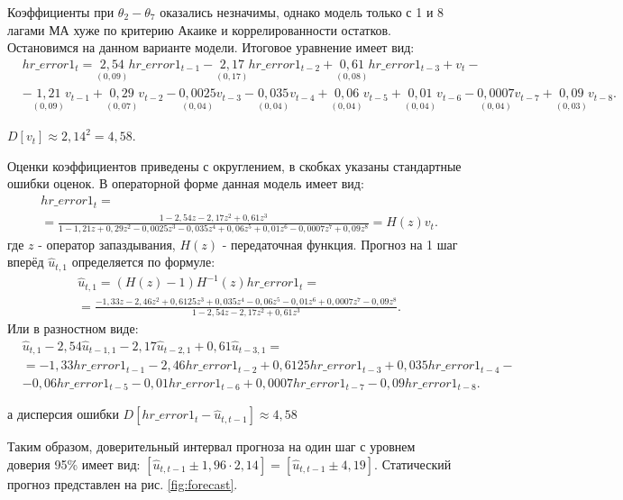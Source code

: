 \documentclass[a4paper,12pt]{article}
\begin{document}
Коэффициенты при $\theta_2-\theta_7$ оказались незначимы, однако модель только с 1 и 8 лагами МА хуже по критерию Акаике и коррелированности остатков. Остановимся на данном варианте модели. Итоговое уравнение имеет вид:
\begin{align*}
&hr\_error1_t =  \underset{(0,09)}{2,54}hr\_error1_{t-1}-\underset{(0,17)}{2,17}hr\_error1_{t-2}+\underset{(0,08)}{0,61}hr\_error1_{t-3}+v_t - \\ &-\underset{(0,09)}{1,21}v_{t-1}+\underset{(0,07)}{0,29}v_{t-2}-\underset{(0,04)}{0,0025}v_{t-3} -\underset{(0,04)}{0,035}v_{t-4}+\underset{(0,04)}{0,06}v_{t-5}+\underset{(0,04)}{0,01}v_{t-6}-\underset{(0,04)}{0,0007}v_{t-7}+\underset{(0,03)}{0,09}v_{t-8}.
\end{align*}

$D[v_t]\approx2,14^2=4,58$.

Оценки коэффициентов приведены с округлением, в скобках указаны стандартные ошибки оценок. В операторной форме данная модель имеет вид:
\begin{align*}
&hr\_error1_t = \\ & = \frac{1-2,54z-2,17z^2+0,61z^3}{1-1,21z+0,29z^2-0,0025z^3-0,035z^4+0,06z^5+0,01z^6-0,0007z^7+0,09z^8}=H(z)v_t.
\end{align*}
где $z$ - оператор запаздывания, $H(z)$ - передаточная функция. Прогноз на 1 шаг вперёд $\hat{u}_{t,1}$ определяется по формуле:
\begin{align*}
&\hat{u}_{t,1}=(H(z)-1)H^{-1}(z)hr\_error1_t= \\
& = \frac{-1,33 z - 2,46 z^2 + 0,6125 z^3 + 0,035 z^4 - 0,06 z^5 - 0,01 z^6 + 0,0007 z^7 - 0,09 z^8}{1-2,54z-2,17z^2+0,61z^3}.
\end{align*}
Или в разностном виде:
\begin{align*}
&\hat{u}_{t,1}-2,54\hat{u}_{t-1,1}-2,17\hat{u}_{t-2,1}+0,61\hat{u}_{t-3,1} = \\
& = -1,33hr\_error1_{t-1} - 2,46 hr\_error1_{t-2} + 0,6125hr\_error1_{t-3} + 0,035hr\_error1_{t-4} - \\
& - 0,06hr\_error1_{t-5} - 0,01 hr\_error1_{t-6} + 0,0007hr\_error1_{t-7} - 0,09hr\_error1_{t-8}.
\end{align*}

а дисперсия ошибки $D[hr\_error1_t-\hat{u}_{t,t-1}]\approx4,58$

Таким образом, доверительный интервал прогноза на один шаг с уровнем доверия 95\% имеет вид: $\left[\hat{u}_{t,t-1}\pm1,96\cdot2,14\right]=\left[\hat{u}_{t,t-1}\pm4,19\right]$. Статический прогноз представлен на рис. \ref{fig:forecast}.
\end{document}
